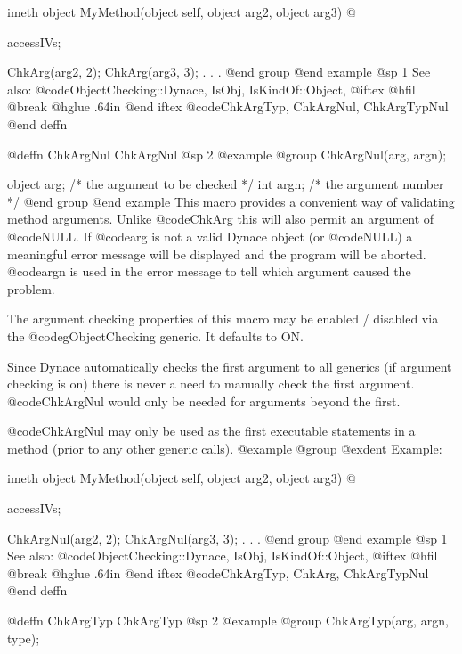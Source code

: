 imeth object  MyMethod(object self, object arg2, object arg3)
@{
        accessIVs;

        ChkArg(arg2, 2);
        ChkArg(arg3, 3);
        .
        .
        .
@end group
@end example
@sp 1
See also:  @code{ObjectChecking::Dynace, IsObj, IsKindOf::Object,}
@iftex
@hfil @break @hglue .64in 
@end iftex
@code{ChkArgTyp, ChkArgNul, ChkArgTypNul}
@end deffn










@deffn {ChkArgNul} ChkArgNul
@sp 2
@example
@group
ChkArgNul(arg, argn);

object  arg;    /*  the argument to be checked  */
int     argn;   /*  the argument number         */
@end group
@end example
This macro provides a convenient way of validating method arguments.
Unlike @code{ChkArg} this will also permit an argument of @code{NULL}.
If @code{arg} is not a valid Dynace object (or @code{NULL}) a meaningful
error message will be displayed and the program will be aborted.
@code{argn} is used in the error message to tell which argument caused
the problem.

The argument checking properties of this macro may be enabled / disabled
via the @code{gObjectChecking} generic.  It defaults to ON.

Since Dynace automatically checks the first argument to all generics (if
argument checking is on) there is never a need to manually check the
first argument.  @code{ChkArgNul} would only be needed for arguments
beyond the first.

@code{ChkArgNul} may only be used as the first executable statements in a
method (prior to any other generic calls).
@example
@group
@exdent Example:

imeth object  MyMethod(object self, object arg2, object arg3)
@{
        accessIVs;

        ChkArgNul(arg2, 2);
        ChkArgNul(arg3, 3);
        .
        .
        .
@end group
@end example
@sp 1
See also:  @code{ObjectChecking::Dynace, IsObj, IsKindOf::Object,}
@iftex
@hfil @break @hglue .64in 
@end iftex
@code{ChkArgTyp, ChkArg, ChkArgTypNul}
@end deffn










@deffn {ChkArgTyp} ChkArgTyp
@sp 2
@example
@group
ChkArgTyp(arg, argn, type);

}}
